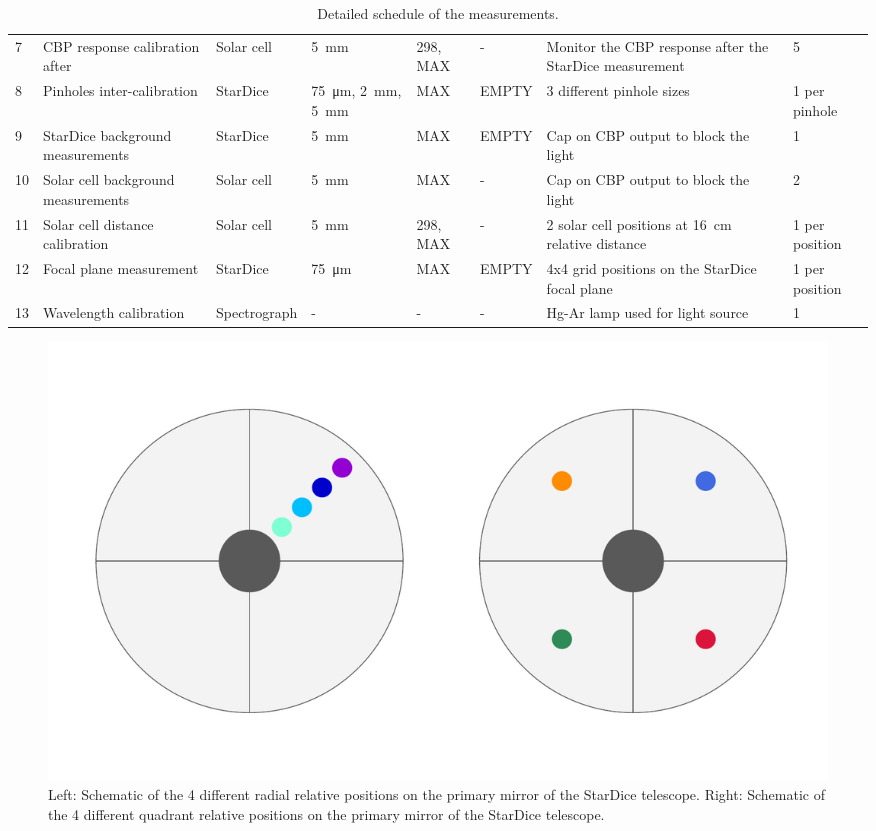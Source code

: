 \begin{table}[t]{}
\begin{tabular}{M{.25cm} M{2.25cm} M{1.75cm} M{1.1cm} M{1.75cm} M{3cm} M{3.5cm} M{1.25cm}}
         7 & CBP response calibration after & Solar cell & \SI{5}{\milli\meter} & 298, MAX & - & Monitor the CBP response after the StarDice measurement & 5 \\
         
         8 & Pinholes inter-calibration & StarDice & \SI{75}{\micro\meter}, \SI{2}{\milli\meter}, \SI{5}{\milli\meter} & MAX & EMPTY & 3 different pinhole sizes & 1 per pinhole \\
            
         9 & StarDice background measurements & StarDice & \SI{5}{\milli\meter} & MAX & EMPTY & Cap on CBP output to block the light & 1 \\
            
         10 & Solar cell background measurements & Solar cell & \SI{5}{\milli\meter} & MAX & - & Cap on CBP output to block the light & 2 \\
            
         11 & Solar cell distance calibration & Solar cell & \SI{5}{\milli\meter} & 298, MAX & - & 2 solar cell positions at \SI{16}{\centi\meter} relative distance & 1 per position \\
            
         12 & Focal plane measurement & StarDice & \SI{75}{\micro\meter} & MAX & EMPTY & 4x4 grid positions on the StarDice focal plane & 1 per position \\
           
         13 & Wavelength calibration & Spectrograph & - & - & - & Hg-Ar lamp used for light source & 1 \\ 
         \hline
    \end{tabular}
    \caption{Detailed schedule of the measurements.}
    \label{tab:schedule}
\end{table}


\begin{figure}[!h]
\centering
\includegraphics[width=\columnwidth]{fig/8_mirror_positions.pdf}
\caption{Left: Schematic of the 4 different radial relative positions on the primary mirror of the StarDice telescope. Right: Schematic of the 4 different quadrant relative positions on the primary mirror of the StarDice telescope.}
\label{fig:8_mirror_positions}
\end{figure}


